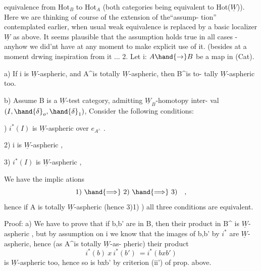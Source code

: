 equivalence from Hot$_B$ to Hot$_A$  (both categories being equivalent to
Hot($\underline{W}$)).  Here we are thinking of course of the extension of the``assump-%
tion'' contemplated earlier,  when usual weak equivalence is replaced by
a basic localizer $\underline{W}$ as above.  It seems plausible that the assumption
holds true in all cases  -  anyhow we did'nt have at any moment to make
explicit use of it. (besides at a moment drwing inspiration from it ...\hand{)}
\hand{\uline{\textcolor{black}{Proposition}}} 2.   Let  i: $A\hand{\to} B$ be a map in (Cat).

a)  If i is $\underline{W}$-aspheric,  and A\^{}is totally $\underline{W}$-aspheric,  then B\^{}is to-%
tally $\underline{W}$-aspheric too.

b)  Assume  B is a $\underline{W}$-test category,  admitting   $\underline{W}_B$-homotopy  inter-%
val$(I,\hand{\delta}_o,\hand{\delta}_1)$,  Consider the following conditions:

)  $i^*(I)$ is $\underline{W}$-aspheric over $e_{A^\wedge}$ . 

2)  i is $\underline{W}$-aspheric ,

3)  $i^*(I)$  is $\underline{W}$-aspheric ,  

We have the implic ations
\[ 1)\ \hand{\Longrightarrow}\ 2)\ \hand{\Longrightarrow}\ 3) \quad , \]
hence if A is totally $\underline{W}$-aspheric (hence  3)\hand{$\Longrightarrow$}1) )  all three conditions
are equivalent.

Proof:   a)  We have to prove that if b,b' are in B,  then
their product in B\^{} is $\underline{W}$-aspheric ,  but by assumption on i we know that
the images of b,b' by $i^*$  are $\underline{W}$-aspheric,  hence (as A\^{}is totally $\underline{W}$-as-%
pheric)  their product
\[ i^*(b) \ x\ i^*(b') \ = i^*(bxb') \]
is $\underline{W}$-aspheric too, hence so is bxb'  by criterion (ii') of prop. above.

